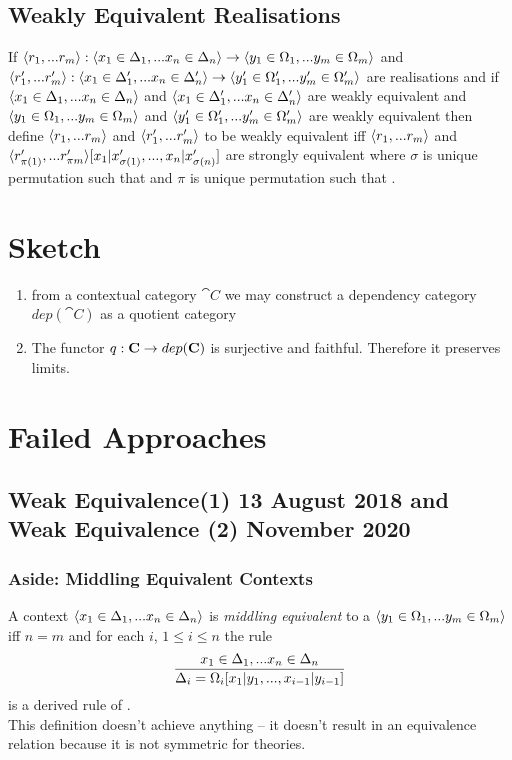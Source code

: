\documentclass[10pt,a4paper]{scrartcl}
\begin{document}
\subsection{Weakly Equivalent Realisations}
If $\langle r_1,...r_m\rangle: \langle x_1 \in \Delta_1,... x_{n} \in \Delta_{n}\rangle \rightarrow \langle y_1 \in \Omega_1,... y_{m} \in \Omega_{m}\rangle$ and
$\langle r'_1,...r'_m\rangle: \langle x_1 \in \Delta'_1,... x_{n} \in \Delta'_{n}\rangle \rightarrow \langle y'_1 \in \Omega'_1,... y'_{m} \in \Omega'_{m}\rangle$ are realisations 
and if $\langle x_1 \in \Delta_1,... x_{n} \in \Delta_{n}\rangle$ and 
$\langle x_1 \in \Delta'_1,... x_{n} \in \Delta'_{n}\rangle$ are weakly equivalent and 
$\langle y_1 \in \Omega_1,... y_{m} \in \Omega_{m}\rangle$ and $\langle y'_1 \in \Omega'_1,... y'_{m} \in \Omega'_{m}\rangle$ are weakly equivalent then
define $\langle r_1,...r_m\rangle$ and $\langle r'_1,...r'_m\rangle$ to be weakly equivalent 
iff 
$\langle r_1,...r_m\rangle$
and
$\langle r'_{\pi(1)},...r'_{\pi{m}}\rangle[x_1|x'_{\sigma(1)},...,x_n|x'_{\sigma(n)}]$
are strongly equivalent
where
$\sigma$ is unique permutation such that 
and $\pi$ is unique permutation such that .


\section{Sketch}
\begin{enumerate}
\item{
from a contextual category $\cat{C}$ we may construct a dependency category $dep(\cat{C})$ as a quotient category
}
\item{
The functor $q:\textbf{C} \rightarrow dep(\textbf{C})$ is surjective and faithful.
Therefore it preserves limits.
}
\end{enumerate}

 
\newpage
\appendix
\section{Failed Approaches}

\subsection{Weak Equivalence(1) 13 August 2018 and Weak Equivalence (2) November 2020}

\begin{oldtt}
\subsubsection{Aside: Middling Equivalent Contexts}

A context $\langle x_1 \in \Delta_1,... x_{n} \in \Delta_{n}\rangle$ 
is  \textit{middling equivalent}  to a $\langle y_1 \in \Omega_1,... y_{m} \in \Omega_{m}\rangle$ iff $n=m$ and for each $i$, $1 \leq i \leq n$ the rule 
$$
\frac{x_1 \in \Delta_1,... x_{n} \in \Delta_{n}}{\Delta_i=\Omega_i[x_1|y_1,...,x_{i-1}|y_{i-1}]}
$$
is a derived rule of \gat. \\

This definition doesn't achieve anything -- it doesn't result in an equivalence relation because it is not symmetric for 
 theories.
\end{oldtt}
\end{document}
